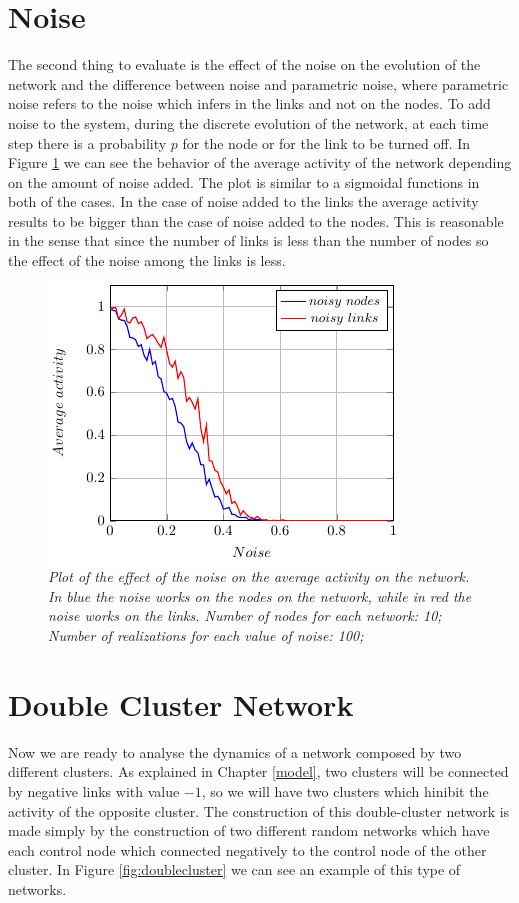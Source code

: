 \section{Noise}
The second thing to evaluate is the effect of the noise on the evolution of the network and the difference between noise and parametric noise, where parametric noise refers to the noise which infers in the links and not on the nodes.
To add noise to the system, during the discrete evolution of the network, at each time step there is a probability $p$ for the node or for the link to be turned off.
In Figure \ref{fig:noise} we can see the behavior of the average activity of the network depending on the amount of noise added. The plot is similar to a sigmoidal functions in both of the cases. In the case of noise added to the links the average activity results to be bigger than the case of noise added to the nodes. This is reasonable in the sense that since the number of links is less than the number of nodes so the effect of the noise among the links is less.
\begin{figure}[h]
\centering
\includegraphics[scale=1.5]{images/noise.pdf}
\caption{\emph{Plot of the effect of the noise on the average activity on the network. In blue the noise works on the nodes on the network, while in red the noise works on the links. Number of nodes for each network: 10; Number of realizations for each value of noise: 100; }}
\label{fig:noise}
\end{figure}

\section{Double Cluster Network}
Now we are ready to analyse the dynamics of a network composed by two different clusters. As explained in Chapter \ref{model}, two clusters will be connected by negative links with value $-1$, so we will have two clusters which hinibit the activity of the opposite cluster.
The construction of this double-cluster network is made simply by the construction of two different random networks which have each control node which connected negatively to the control node of the other cluster. In Figure \ref{fig:doublecluster} we can see an example of this type of networks.

